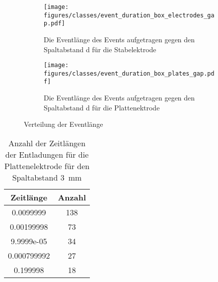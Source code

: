 \begin{figure}[H]
  \centering
  \begin{subfigure}[t]{0.48\textwidth}
    \centering
    \texttt{[image: figures/classes/event\_duration\_box\_electrodes\_gap.pdf]}
    \caption{Die Eventlänge des Events aufgetragen gegen den Spaltabstand d für die Stabelektrode}
    \label{fig:box-gap-event-duration-stab}
  \end{subfigure}
  \begin{subfigure}[t]{0.48\textwidth}
    \centering
    \texttt{[image: figures/classes/event\_duration\_box\_plates\_gap.pdf]}
    \caption{Die Eventlänge des Events aufgetragen gegen den Spaltabstand d für die Plattenektrode}
    \label{fig:box-gap-event-duration-plate}
  \end{subfigure}
  \caption{Verteilung der Eventlänge}
  \label{fig:box-gap-event-duration}
\end{figure}


\begin{table}[h!]
\centering
\begin{tabular}{|c|c|}
\hline
\textbf{Zeitlänge} & \textbf{Anzahl} \\
\hline
0.0099999   & 138 \\
0.00199998  & 73  \\
9.9999e-05  & 34  \\
0.000799992 & 27  \\
0.199998    & 18  \\
\hline
\end{tabular}
\caption{Anzahl der Zeitlängen der Entladungen für die Plattenelektrode für den Spaltabstand \SI{3}{\milli\meter}}
\label{tab:timelen-plate-3}
\end{table}















